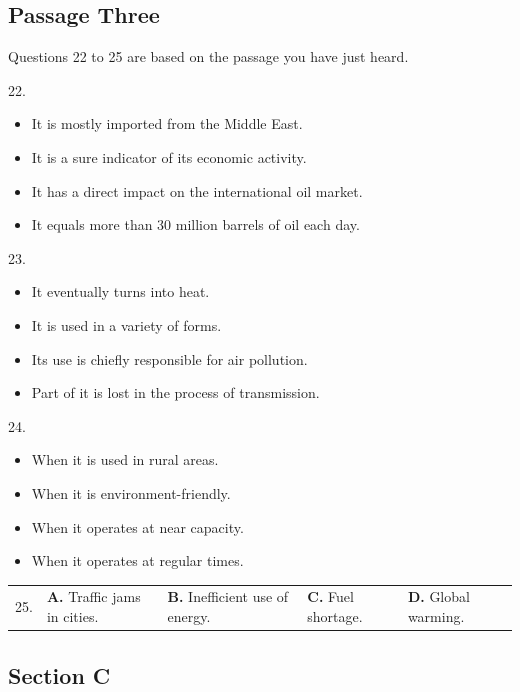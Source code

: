 \documentclass[UTF8,11pt]{ctexart}
\begin{document}
\subsection*{Passage Three}


Questions 22 to 25 are based on the passage you have just heard.


22.


\begin{itemize}[leftmargin=2em,itemsep=.2em,topsep=.4em]\item[A.] It is mostly imported from the Middle East.
\item[B.] It is a sure indicator of its economic activity.
\item[C.] It has a direct impact on the international oil market.
\item[D.] It equals more than 30 million barrels of oil each day.
\end{itemize}

23.


\begin{itemize}[leftmargin=2em,itemsep=.2em,topsep=.4em]\item[A.] It eventually turns into heat.
\item[B.] It is used in a variety of forms.
\item[C.] Its use is chiefly responsible for air pollution.
\item[D.] Part of it is lost in the process of transmission.
\end{itemize}

24.


\begin{itemize}[leftmargin=2em,itemsep=.2em,topsep=.4em]\item[A.] When it is used in rural areas.
\item[B.] When it is environment-friendly.
\item[C.] When it operates at near capacity.
\item[D.] When it operates at regular times.
\end{itemize}

\noindent\begin{tabularx}{\linewidth}{@{}lXXXX@{}}25. & \textbf{A.} Traffic jams in cities. & \textbf{B.} Inefficient use of energy. & \textbf{C.} Fuel shortage. & \textbf{D.} Global warming.\\\end{tabularx}\par

\subsection*{\textbf{Section C}}
\end{document}
